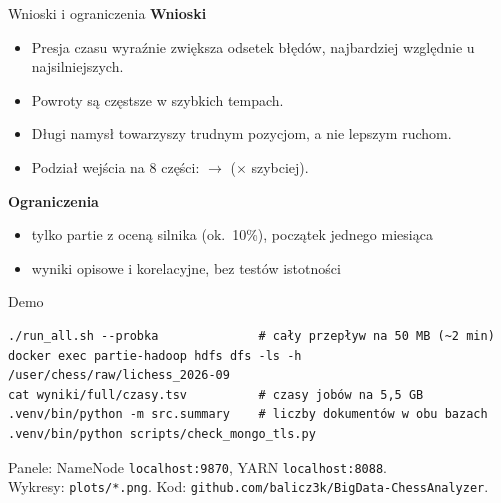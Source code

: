 \documentclass[aspectratio=169,11pt]{beamer}
\newcommand{\kod}[1]{\texttt{#1}}
\begin{document}
\begin{frame}{Wnioski i ograniczenia}
\textbf{Wnioski}
\begin{itemize}
\item Presja czasu wyraźnie zwiększa odsetek błędów, najbardziej względnie u najsilniejszych.
\item Powroty są częstsze w szybkich tempach.
\item Długi namysł towarzyszy trudnym pozycjom, a nie lepszym ruchom.
\item Podział wejścia na 8 części: \tOne{} $\to$ \tEight{} (\speedup$\times$ szybciej).
\end{itemize}
\textbf{Ograniczenia}
\begin{itemize}
\item tylko partie z oceną silnika (ok.\ 10\%), początek jednego miesiąca
\item wyniki opisowe i korelacyjne, bez testów istotności
\end{itemize}
\end{frame}

\begin{frame}[fragile]{Demo}
\small
\begin{verbatim}
./run_all.sh --probka              # cały przepływ na 50 MB (~2 min)
docker exec partie-hadoop hdfs dfs -ls -h /user/chess/raw/lichess_2026-09
cat wyniki/full/czasy.tsv          # czasy jobów na 5,5 GB
.venv/bin/python -m src.summary    # liczby dokumentów w obu bazach
.venv/bin/python scripts/check_mongo_tls.py
\end{verbatim}
\normalsize
Panele: NameNode \kod{localhost:9870}, YARN \kod{localhost:8088}.\\
Wykresy: \kod{plots/*.png}. Kod: \kod{github.com/balicz3k/BigData-ChessAnalyzer}.
\end{frame}
\end{document}

